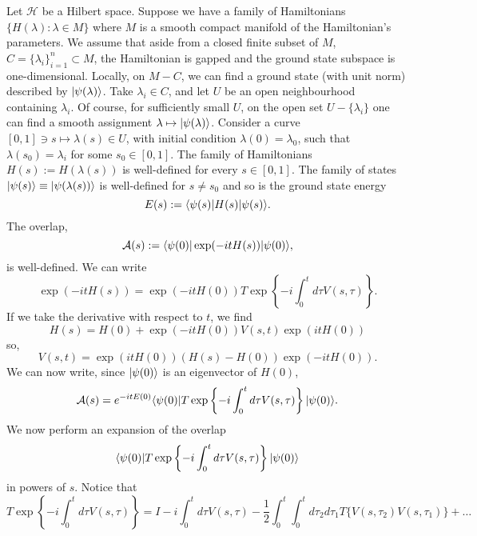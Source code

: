 Let $\mathscr{H}$ be a Hilbert space. Suppose we have a family of Hamiltonians $\{H(\lambda):\lambda \in M\}$ where $M$ is a smooth  compact manifold of the Hamiltonian's parameters. We assume that aside from a closed finite subset of $M$, $C=\{\lambda_{i}\}_{i=1}^{n}\subset M$, the Hamiltonian is gapped and the ground state subspace is one-dimensional. Locally, on $M-C$, we can find a ground state (with unit norm) described by $| \psi(\lambda) \rangle$. Take $\lambda_i\in C$, and let $U$ be an open neighbourhood containing $\lambda_i$. Of course, for sufficiently small $U$, on the open set $U-\{\lambda_i\}$ one can find a smooth assignment $\lambda\mapsto | \psi(\lambda) \rangle$. Consider a curve $[0,1]\ni s\mapsto \lambda(s)\in U$, with initial condition $\lambda(0)=\lambda_0$, such that $\lambda(s_0)=\lambda_i$ for some $s_0\in[0,1]$. The family of Hamiltonians $H(s):=H(\lambda(s))$ is well-defined for every $s\in [0,1]$. The family of states $| \psi(s) \rangle\equiv | \psi(\lambda(s)) \rangle$ is well-defined for $s\neq s_0$ and so is the ground state energy
\begin{equation*}
E(s):=\langle \psi(s) |H(s)| \psi(s) \rangle.
\end{equation*} 
The overlap,
\begin{equation*}
\mathcal{A}(s):=\langle \psi(0) |\exp(-itH(s))| \psi(0) \rangle,
\end{equation*}
is well-defined. We can write
\begin{equation*}
\exp(-itH(s))=\exp(-itH(0)) T\exp\left\{-i\int_{0}^{t} d\tau V(s,\tau)\right\}.
\end{equation*}
If we take the derivative with respect to $t$, we find
\begin{equation*}
H(s)=H(0) +\exp(-itH(0))V(s,t)\exp(itH(0))
\end{equation*}
so,
\begin{equation*}
V(s,t)=\exp(itH(0)) (H(s)-H(0))\exp(-itH(0)).
\end{equation*}
We can now write, since $| \psi(0) \rangle$ is an eigenvector of $H(0)$,
\begin{equation*}
\mathcal{A}(s)=e^{-it E(0)} \langle \psi(0) |T\exp\left\{-i\int_{0}^{t} d\tau V(s,\tau)\right\}| \psi(0) \rangle.
\end{equation*}
We now perform an expansion of the overlap
\begin{equation*}
\langle \psi(0) |T\exp\left\{-i\int_{0}^{t} d\tau V(s,\tau)\right\}| \psi(0) \rangle
\end{equation*}
in powers of $s$. Notice that
\begin{equation*}
 T \exp\left\{-i\int_{0}^{t} d\tau V(s,\tau)\right\}= I -i\int_{0}^{t} d\tau V(s,\tau)-\frac{1}{2}\int_{0}^{t}\int_{0}^{t}d\tau_2 d\tau_1 T\{V(s,\tau_2) V(s,\tau_1)\}+\dots
\end{equation*}
